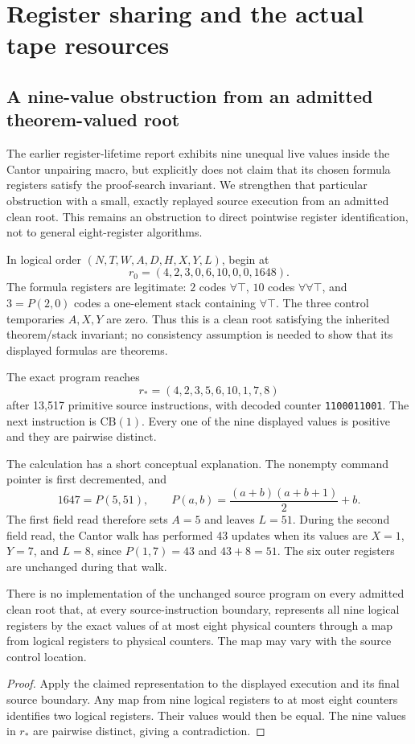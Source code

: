 \section{Register sharing and the actual tape resources}
\label{sec:state-reduction-new}

\subsection{A nine-value obstruction from an admitted theorem-valued root}

The earlier register-lifetime report exhibits nine unequal live values inside
the Cantor unpairing macro, but explicitly does not claim that its chosen
formula registers satisfy the proof-search invariant. We strengthen that
particular obstruction with a small, exactly replayed source execution from
an admitted clean root. This remains an obstruction to direct pointwise
register identification, not to general eight-register algorithms.

In logical order $(N,T,W,A,D,H,X,Y,L)$, begin at
\[
  r_0=(4,2,3,0,6,10,0,0,1648).
\]
The formula registers are legitimate: $2$ codes $\forall\top$, $10$ codes
$\forall\forall\top$, and $3=P(2,0)$ codes a one-element stack containing
$\forall\top$. The three control temporaries $A,X,Y$ are zero. Thus this is
a clean root satisfying the inherited theorem/stack invariant; no consistency
assumption is needed to show that its displayed formulas are theorems.

The exact program reaches
\[
  r_*=(4,2,3,5,6,10,1,7,8)
\]
after 13,517 primitive source instructions, with decoded counter
\texttt{1100011001}. The next instruction is $\mathrm{CB}(1)$. Every one of
the nine displayed values is positive and they are pairwise distinct.

The calculation has a short conceptual explanation. The nonempty command
pointer is first decremented, and
\[
  1647=P(5,51),\qquad P(a,b)=\frac{(a+b)(a+b+1)}2+b.
\]
The first field read therefore sets $A=5$ and leaves $L=51$. During the
second field read, the Cantor walk has performed 43 updates when its values
are $X=1$, $Y=7$, and $L=8$, since $P(1,7)=43$ and $43+8=51$.
The six outer registers are unchanged during that walk.

\begin{proposition}
There is no implementation of the unchanged source program on every admitted
clean root that, at every source-instruction boundary, represents all nine
logical registers by the exact values of at most eight physical counters
through a map from logical registers to physical counters. The map may vary
with the source control location.
\end{proposition}
\begin{proof}
Apply the claimed representation to the displayed execution and its final
source boundary. Any map from nine logical registers to at most eight counters
identifies two logical registers. Their values would then be equal. The nine
values in $r_*$ are pairwise distinct, giving a contradiction.
\end{proof}

